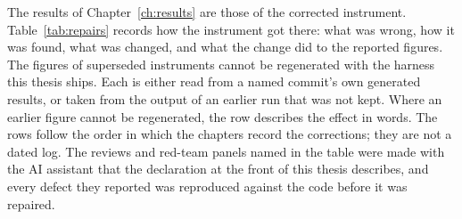 The results of Chapter~\ref{ch:results} are those of the corrected instrument. Table~\ref{tab:repairs} records how the instrument got there: what was wrong, how it was found, what was changed, and what the change did to the reported figures. The figures of superseded instruments cannot be regenerated with the harness this thesis ships. Each is either read from a named commit's own generated results, or taken from the output of an earlier run that was not kept. Where an earlier figure cannot be regenerated, the row describes the effect in words. The rows follow the order in which the chapters record the corrections; they are not a dated log. The reviews and red-team panels named in the table were made with the AI assistant that the declaration at the front of this thesis describes, and every defect they reported was reproduced against the code before it was repaired.

